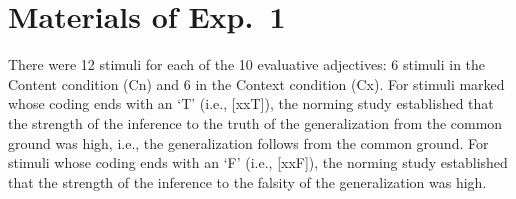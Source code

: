 \documentclass[11pt,fleqn]{article}
\newcommand{\6}{\mbox{$[\hspace*{-.6mm}[$}}
\newcommand{\9}{\mbox{$]\hspace*{-.6mm}]$}}
\begin{document}
%
%
%


\section{Materials of Exp.~1}\label{a-Exp1}

There were 12 stimuli for each of the 10 evaluative adjectives: 6 stimuli in the Content condition (Cn) and 6 in the Context condition (Cx). For stimuli marked whose coding ends with an `T' (i.e., [xxT]), the norming study established that the strength of the inference to the truth of the generalization from the common ground was high, i.e., the generalization follows from the common ground. For stimuli whose coding ends with an `F' (i.e., [xxF]), the norming study established that the strength of the inference to the falsity of the generalization was high.
\end{document}
